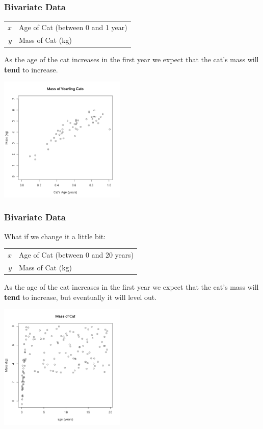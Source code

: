 \begin{frame}
  \frametitle{Bivariate Data}

  \begin{tabular}{r@{~$=$~}l}
    $x$ & Age of Cat (between 0 and 1 year)  \\
    $y$ & Mass of Cat (kg)
  \end{tabular}
  
  \vfill

  {

    As the age of the cat increases in the first year we expect that
    the cat's mass will \textbf{\color{red}tend} to increase.

  }

  {
    \includegraphics[width=6cm]{img/catsmass}
  }

  \vfill


\end{frame}


\begin{frame}
  \frametitle{Bivariate Data}

  \vspace*{-1em}
  What if we change it a little bit: \\
  \begin{tabular}{r@{~$=$~}l}
    $x$ & Age of Cat (between 0 and 20 years)  \\
    $y$ & Mass of Cat (kg)
  \end{tabular}
  
  \vfill

  {

    As the age of the cat increases in the first year we expect that
    the cat's mass will \textbf{tend} to increase, but eventually it
    will level out.

  }

  {
    \vspace*{-1em}
    \includegraphics[width=6cm]{img/catsmassLater}
  }

  \vfill


\end{frame}


